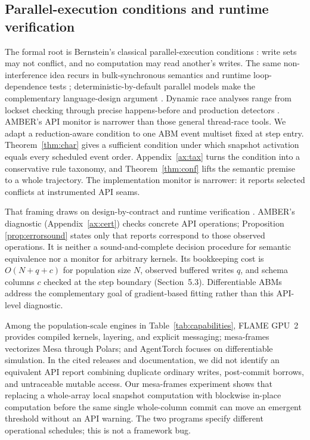 \documentclass[sigconf,nonacm,review,natbib=true]{acmart}
\theoremstyle{definition}
\theoremstyle{plain}
\theoremstyle{remark}
\begin{document}
\subsection{Parallel-execution conditions and runtime verification}

The formal root is Bernstein's classical parallel-execution conditions
\citep{bernstein1966}: write sets may not conflict, and no computation may read
another's writes. The same non-interference idea recurs in bulk-synchronous
semantics and runtime loop-dependence tests
\citep{valiant1990,rauchwerger1995}; deterministic-by-default parallel models
make the complementary language-design argument \citep{bocchino2009}. Dynamic
race analyses range from lockset checking through precise happens-before and
production detectors \citep{savage1997,flanagan2009,serebryany2009}. AMBER's
API monitor is narrower than those general thread-race tools. We adapt a
reduction-aware condition to one ABM event multiset fixed at step entry. Theorem~\ref{thm:char}
gives a sufficient condition under which snapshot activation equals every
scheduled event order. Appendix~\ref{ax:tax} turns the condition into a
conservative rule taxonomy, and Theorem~\ref{thm:conf} lifts the semantic
premise to a whole trajectory. The implementation monitor is narrower: it
reports selected conflicts at instrumented API seams.

That framing draws on design-by-contract \citep{meyer1992} and runtime
verification \citep{bartocci2018,leucker2009}. AMBER's diagnostic
(Appendix~\ref{ax:cert}) checks concrete API operations; Proposition
\ref{prop:errorsound} states only that reports correspond to those observed
operations. It is neither a sound-and-complete decision procedure for semantic
equivalence nor a monitor for arbitrary kernels. Its bookkeeping cost is
$O(N+q+c)$ for population size $N$, observed buffered writes $q$, and schema
columns $c$ checked at the step boundary (Section~5.3). Differentiable ABMs
\citep{chopra2023,chopra2025,querabofarull2023} address the complementary goal
of gradient-based fitting rather than this API-level diagnostic.

Among the population-scale engines in Table~\ref{tab:capabilities}, FLAME
GPU~2 \citep{richmond2023} provides compiled kernels, layering, and explicit
messaging; mesa-frames \citep{mesaframes} vectorizes Mesa through Polars; and
AgentTorch \citep{chopra2023,chopra2025} focuses on differentiable simulation.
In the cited releases and documentation, we did not identify an equivalent API
report combining duplicate ordinary writes, post-commit borrows, and
untraceable mutable access. Our mesa-frames
experiment shows that replacing a whole-array local snapshot computation with
blockwise in-place computation before the same single whole-column commit can
move an emergent threshold without an API warning. The two programs specify
different operational schedules; this is not a framework bug.
\end{document}
